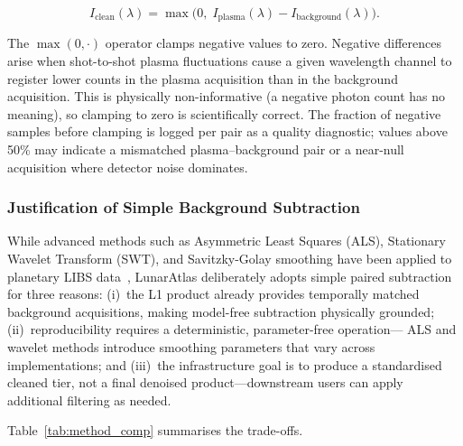 \documentclass[a4paper,twocolumn,10pt]{article}
\begin{document}
\begin{equation}
\label{eq:subtraction}
I_{\text{clean}}(\lambda) =
  \max\!\bigl(0,\;
  I_{\text{plasma}}(\lambda) - I_{\text{background}}(\lambda)
  \bigr).
\end{equation}

The $\max(0, \cdot)$ operator clamps negative values to zero.
Negative differences arise when shot-to-shot plasma fluctuations cause
a given wavelength channel to register lower counts in the plasma
acquisition than in the background acquisition.  This is physically
non-informative (a negative photon count has no meaning), so clamping
to zero is scientifically correct.  The fraction of negative samples
before clamping is logged per pair as a quality diagnostic; values
above 50\% may indicate a mismatched plasma--background pair or
a near-null acquisition where detector noise dominates.

\subsubsection{Justification of Simple Background Subtraction}

While advanced methods such as Asymmetric Least Squares (ALS), Stationary
Wavelet Transform (SWT), and Savitzky-Golay smoothing have been applied
to planetary LIBS data~\cite{Clegg2017,Anderson2022,Sridhar2025}, LunarAtlas
deliberately adopts simple paired subtraction for three reasons:
(i)~the L1 product already provides temporally matched background
acquisitions, making model-free subtraction physically grounded;
(ii)~reproducibility requires a deterministic, parameter-free operation---
ALS and wavelet methods introduce smoothing parameters that vary across
implementations; and (iii)~the infrastructure goal is to produce a
standardised cleaned tier, not a final denoised product---downstream users
can apply additional filtering as needed.

Table~\ref{tab:method_comp} summarises the trade-offs.
\end{document}
